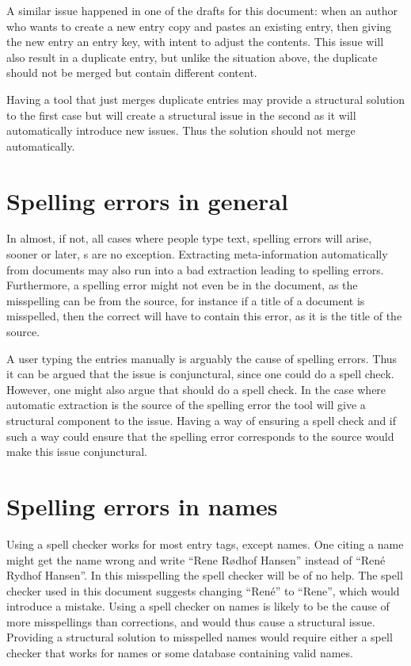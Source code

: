 A similar issue happened in one of the drafts for this document: when
an author who wants to create a new entry copy and pastes an existing
entry, then giving the new entry an entry key, with intent to adjust
the contents.  This issue will also result in a duplicate entry, but
unlike the situation above, the duplicate should not be merged but
contain different content.

Having a tool that just merges duplicate entries may provide a
structural solution to the first case but will create a structural
issue in the second as it will automatically introduce new issues.
Thus the solution should not merge automatically.


\section{Spelling errors in general}
\label{sec:problems_spelling}

In almost, if not, all cases where people type text, spelling errors
will arise, sooner or later, s are no exception.  Extracting
meta-information automatically from documents may also run into a bad
extraction leading to spelling errors.  Furthermore, a spelling error
might not even be in the {\bibtex} document, as the misspelling can be
from the source, for instance if a title of a document is misspelled,
then the correct {\bibtex} will have to contain this error, as it is
the title of the source.

A user typing the entries manually is arguably the cause of spelling
errors.  Thus it can be argued that the issue is conjunctural, since
one could do a spell check.  However, one might also argue that
{\bibtex} should do a spell check.  In the case where automatic
extraction is the source of the spelling error the tool will give a
structural component to the issue.  Having a way of ensuring a spell
check and if such a way could ensure that the spelling error
corresponds to the source would make this issue conjunctural.


\section{Spelling errors in names}
\label{sec:problems_spelling_names}

Using a spell checker works for most entry tags, except names.  One
citing a name might get the name wrong and write ``Rene Rødhof
Hansen'' instead of ``René Rydhof Hansen''.  In this misspelling the
spell checker will be of no help.  The spell checker used in this
document suggests changing ``René'' to ``Rene'', which would introduce
a mistake.  Using a spell checker on names is likely to be the cause
of more misspellings than corrections, and would thus cause a
structural issue.  Providing a structural solution to misspelled names
would require either a spell checker that works for names or some
database containing valid names.


